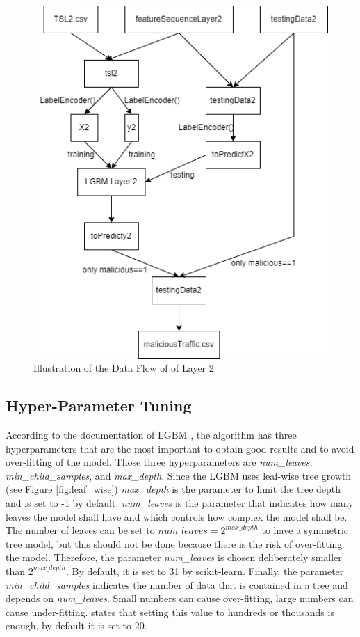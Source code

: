\begin{figure} [h]
\includegraphics[scale=0.5]{images/layer_2.png}
\centering
\caption{Illustration of the Data Flow of of Layer 2}
\label{fig:layer_2}
\end{figure}

\subsection{Hyper-Parameter Tuning} \label{hyp_par}
According to the documentation of LGBM \cite{lightGBM}, the algorithm has three hyperparameters that are the most important to obtain good results and to avoid over-fitting of the model. Those three hyperparameters are \textit{num\_leaves}, \textit{min\_child\_samples}, and \textit{max\_depth}. Since the LGBM uses leaf-wise tree growth (see Figure \ref{fig:leaf_wise}) \textit{max\_depth} is the parameter to limit the tree depth and is set to -1 by default. \textit{num\_leaves} is the parameter that indicates how many leaves the model shall have and which controls how complex the model shall be. The number of leaves can be set to $num\_leaves = 2^{max\_depth}$ to have a symmetric tree model, but this should not be done because there is the risk of over-fitting the model. Therefore, the parameter \textit{num\_leaves} is chosen deliberately smaller than $2^{max\_depth}$. By default, it is set to 31 by scikit-learn. Finally, the parameter \textit{min\_child\_samples} indicates the number of data that is contained in a tree and depends on \textit{num\_leaves}. Small numbers can cause over-fitting, large numbers can cause under-fitting. \cite{lightGBM} states that setting this value to hundreds or thousands is enough, by default it is set to 20.

